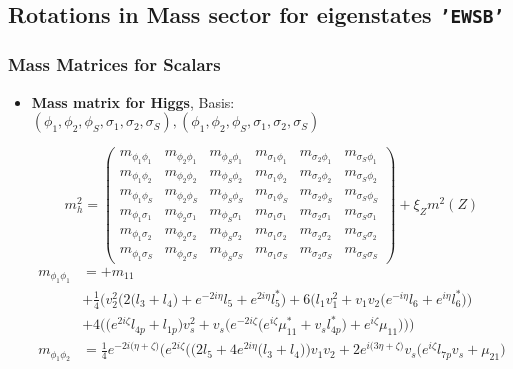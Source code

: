 \subsection{Rotations in Mass sector for eigenstates {\tt 'EWSB'} } 
\subsubsection{Mass Matrices for Scalars}
\begin{itemize} 
\item {\bf Mass matrix for Higgs}, Basis: \( \left(\phi_1, \phi_2, \phi_S, \sigma_1, \sigma_2, \sigma_S\right), \left(\phi_1, \phi_2, \phi_S, \sigma_1, \sigma_2, \sigma_S\right) \) 
 
\begin{equation} 
m^2_{h} = \left( 
\begin{array}{cccccc}
m_{\phi_1\phi_1} &m_{\phi_2\phi_1} &m_{\phi_S\phi_1} &m_{\sigma_1\phi_1} &m_{\sigma_2\phi_1} &m_{\sigma_S\phi_1}\\ 
m_{\phi_1\phi_2} &m_{\phi_2\phi_2} &m_{\phi_S\phi_2} &m_{\sigma_1\phi_2} &m_{\sigma_2\phi_2} &m_{\sigma_S\phi_2}\\ 
m_{\phi_1\phi_S} &m_{\phi_2\phi_S} &m_{\phi_S\phi_S} &m_{\sigma_1\phi_S} &m_{\sigma_2\phi_S} &m_{\sigma_S\phi_S}\\ 
m_{\phi_1\sigma_1} &m_{\phi_2\sigma_1} &m_{\phi_S\sigma_1} &m_{\sigma_1\sigma_1} &m_{\sigma_2\sigma_1} &m_{\sigma_S\sigma_1}\\ 
m_{\phi_1\sigma_2} &m_{\phi_2\sigma_2} &m_{\phi_S\sigma_2} &m_{\sigma_1\sigma_2} &m_{\sigma_2\sigma_2} &m_{\sigma_S\sigma_2}\\ 
m_{\phi_1\sigma_S} &m_{\phi_2\sigma_S} &m_{\phi_S\sigma_S} &m_{\sigma_1\sigma_S} &m_{\sigma_2\sigma_S} &m_{\sigma_S\sigma_S}\end{array} 
\right) +  \xi_{Z}m^2(Z) 
 \end{equation} 
\begin{align} 
m_{\phi_1\phi_1} &= +m_{11}\nonumber \\ 
 &+\frac{1}{4} \Big(v_{2}^{2} \Big(2 \Big(l_3 + l_4\Big) + e^{-2 i \eta } l_5  + e^{2 i \eta } l_5^* \Big)+6 \Big(l_1 v_{1}^{2}  + v_1 v_2 \Big(e^{-i \eta } l_6  + e^{i \eta } l_6^* \Big)\Big)\nonumber \\ 
 &+4 \Big(\Big(e^{2 i \zeta } l_{4p}  + l_{1p}\Big)v_{s}^{2}  + v_s \Big(e^{-2 i \zeta } \Big(e^{i \zeta } \mu_{11}^*  + v_s l_{4p}^* \Big) + e^{i \zeta } \mu_{11} \Big)\Big)\Big)\\ 
m_{\phi_1\phi_2} &= \frac{1}{4} e^{-2 i \Big(\eta +\zeta \Big)} \Big(e^{2 i \zeta } \Big(\Big(2 l_5  + 4 e^{2 i \eta } \Big(l_3 + l_4\Big)\Big)v_1 v_2 +2 e^{i \Big(3 \eta +\zeta \Big)} v_s \Big(e^{i \zeta } l_{7p} v_s  + \mu_{21}\Big)\nonumber \\ 

\end{align}
\end{itemize}
